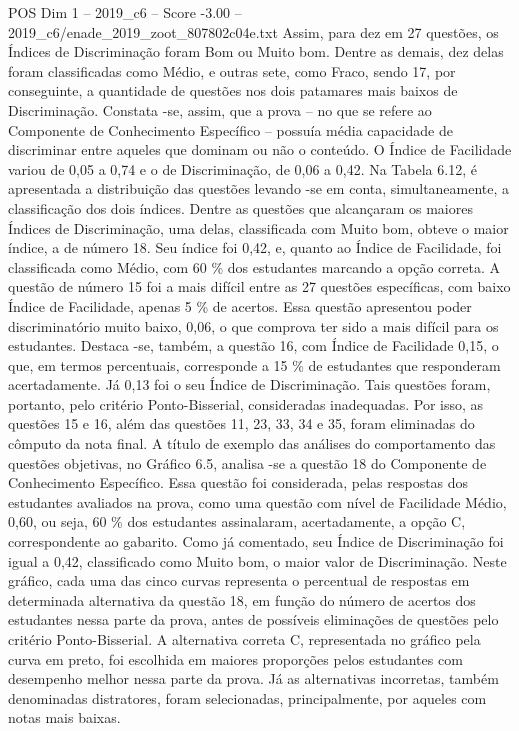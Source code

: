 \begin{textsample}{POS Dim 1 – 2019\_c6 – Score -3.00 – 2019\_c6/enade\_2019\_zoot\_807802c04e.txt}
Assim, para dez em 27 questões, os Índices de Discriminação foram Bom ou Muito bom.
Dentre as demais, dez delas foram classificadas como Médio, e outras sete, como Fraco, sendo 17, por conseguinte, a quantidade de questões nos dois patamares mais baixos de Discriminação.
Constata -se, assim, que a prova – no que se refere ao Componente de Conhecimento Específico – possuía média capacidade de discriminar entre aqueles que dominam ou não o conteúdo.
O Índice de Facilidade variou de 0,05 a 0,74 e o de Discriminação, de 0,06 a 0,42.
Na Tabela 6.12, é apresentada a distribuição das questões levando -se em conta, simultaneamente, a classificação dos dois índices.
Dentre as questões que alcançaram os maiores Índices de Discriminação, uma delas, classificada com Muito bom, obteve o maior índice, a de número 18.
Seu índice foi 0,42, e, quanto ao Índice de Facilidade, foi classificada como Médio, com 60 \% dos estudantes marcando a opção correta.
A questão de número 15 foi a mais difícil entre as 27 questões específicas, com baixo Índice de Facilidade, apenas 5 \% de acertos.
Essa questão apresentou poder discriminatório muito baixo, 0,06, o que comprova ter sido a mais difícil para os estudantes.
Destaca -se, também, a questão 16, com Índice de Facilidade 0,15, o que, em termos percentuais, corresponde a 15 \% de estudantes que responderam acertadamente.
Já 0,13 foi o seu Índice de Discriminação.
Tais questões foram, portanto, pelo critério Ponto-Bisserial, consideradas inadequadas.
Por isso, as questões 15 e 16, além das questões 11, 23, 33, 34 e 35, foram eliminadas do cômputo da nota final.
A título de exemplo das análises do comportamento das questões objetivas, no Gráfico 6.5, analisa -se a questão 18 do Componente de Conhecimento Específico.
Essa questão foi considerada, pelas respostas dos estudantes avaliados na prova, como uma questão com nível de Facilidade Médio, 0,60, ou seja, 60 \% dos estudantes assinalaram, acertadamente, a opção C, correspondente ao gabarito.
Como já comentado, seu Índice de Discriminação foi igual a 0,42, classificado como Muito bom, o maior valor de Discriminação.
Neste gráfico, cada uma das cinco curvas representa o percentual de respostas em determinada alternativa da questão 18, em função do número de acertos dos estudantes nessa parte da prova, antes de possíveis eliminações de questões pelo critério Ponto-Bisserial.
A alternativa correta C, representada no gráfico pela curva em preto, foi escolhida em maiores proporções pelos estudantes com desempenho melhor nessa parte da prova.
Já as alternativas incorretas, também denominadas distratores, foram selecionadas, principalmente, por aqueles com notas mais baixas.

\end{textsample}
